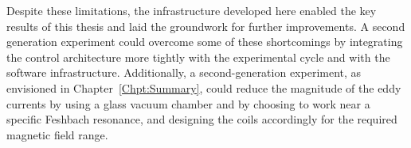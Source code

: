 Despite these limitations, the infrastructure developed here enabled the key results of this thesis and laid the groundwork for further improvements. A second generation experiment could overcome some of these shortcomings by integrating the control architecture more tightly with the experimental cycle and with the software infrastructure. Additionally, a second-generation experiment, as envisioned in Chapter~\ref{Chpt:Summary}, could reduce the magnitude of the eddy currents by using a glass vacuum chamber and by choosing to work near a specific Feshbach resonance, and designing the coils accordingly for the required magnetic field range.
